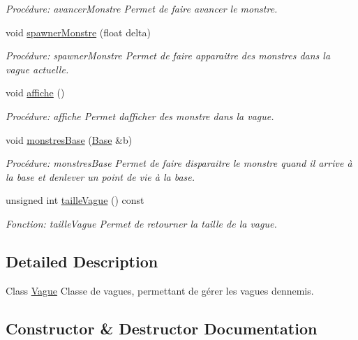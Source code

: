 \begin{DoxyCompactItemize}
\begin{DoxyCompactList}\small\item\em Procédure\+: avancer\+Monstre Permet de faire avancer le monstre. \end{DoxyCompactList}\item 
void \hyperlink{classVague_a08f321266ddbf3e852b9d48975849f98}{spawner\+Monstre} (float delta)
\begin{DoxyCompactList}\small\item\em Procédure\+: spawner\+Monstre Permet de faire apparaitre des monstres dans la vague actuelle. \end{DoxyCompactList}\item 
void \hyperlink{classVague_adec201ad91a86f65bf6aaf0ddb73bd20}{affiche} ()
\begin{DoxyCompactList}\small\item\em Procédure\+: affiche Permet d\textquotesingle{}afficher des monstre dans la vague. \end{DoxyCompactList}\item 
void \hyperlink{classVague_ad9d543a1eafc579d8a4de88d278a53a7}{monstres\+Base} (\hyperlink{classBase}{Base} \&b)
\begin{DoxyCompactList}\small\item\em Procédure\+: monstres\+Base Permet de faire disparaitre le monstre quand il arrive à la base et d\textquotesingle{}enlever un point de vie à la base. \end{DoxyCompactList}\item 
unsigned int \hyperlink{classVague_a00fd363241fbfd6ed6819d408155a6ee}{taille\+Vague} () const
\begin{DoxyCompactList}\small\item\em Fonction\+: taille\+Vague Permet de retourner la taille de la vague. \end{DoxyCompactList}\end{DoxyCompactItemize}


\subsection{Detailed Description}
Class \hyperlink{classVague}{Vague} Classe de vagues, permettant de gérer les vagues d\textquotesingle{}ennemis. 

\subsection{Constructor \& Destructor Documentation}
\mbox{\label{classVague_ab1e4786aa02ad641431b56658dbbaac3}} 
